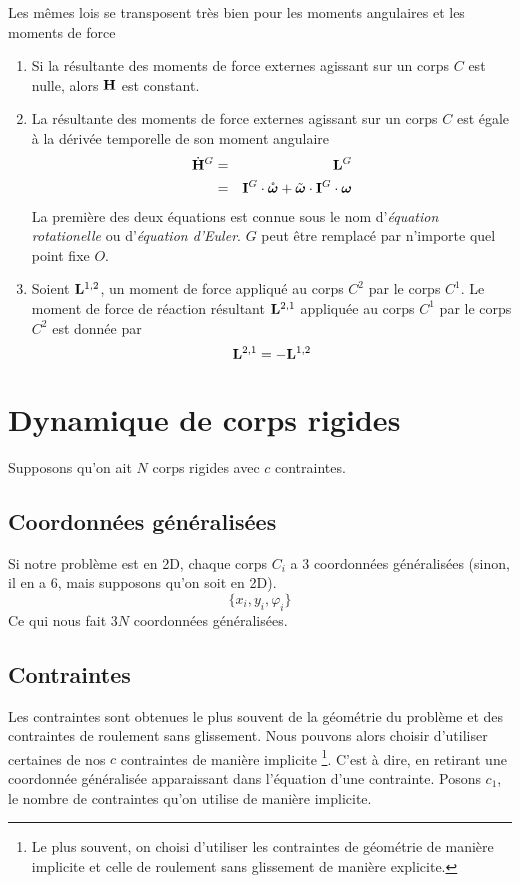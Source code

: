 \documentclass[11pt,a4paper]{article}
\newcommand\omegaf{{\bm \omega}}
\newcommand\omegafr{\mathring{\bm \omega}}
\newcommand\omegaft{\tilde{\bm \omega}}
\newcommand\ine{{\bf I}}
\newcommand\st{{\bf L}}
\newcommand\am{{\bf H}}
\newcommand\amd{\dot{\am}}
\begin{document}
Les mêmes lois se transposent très bien pour les moments angulaires et les moments de force
\begin{enumerate}
	\item Si la résultante des moments de force externes agissant sur un corps $C$ est nulle, alors $\am$ est constant.
	\item La résultante des moments de force externes agissant sur un corps $C$ est égale à la dérivée temporelle de son moment angulaire
		\begin{eqnarray*}
			\amd^G &=& \st^G\\
			&=& \ine^G\cdot\omegafr + \omegaft\cdot\ine^G\cdot\omegaf
		\end{eqnarray*}
		La première des deux équations est connue sous le nom d'{\em équation rotationelle} ou d'{\em équation d'Euler}.
		$G$ peut être remplacé par n'importe quel point fixe $O$.
	\item Soient $\st^{1,2}$, un moment de force appliqué au corps $C^2$ par le corps $C^1$.
		Le moment de force de réaction résultant $\st^{2,1}$ appliquée au corps $C^1$ par le corps $C^2$ est donnée par
		\[ \st^{2,1} = -\st^{1,2} \]
\end{enumerate}

\section{Dynamique de corps rigides}

Supposons qu'on ait $N$ corps rigides avec $c$ contraintes.

\subsection{Coordonnées généralisées}
Si notre problème est en 2D, chaque corps $C_i$ a 3 coordonnées généralisées (sinon, il en a 6, mais supposons qu'on soit en 2D).
\[ \{x_i, y_i, \varphi_i \} \]
Ce qui nous fait $3N$ coordonnées généralisées.

\subsection{Contraintes}
Les contraintes sont obtenues le plus souvent de la géométrie du problème et des contraintes de roulement sans glissement.
Nous pouvons alors choisir d'utiliser certaines de nos $c$ contraintes de manière implicite
\footnote{Le plus souvent, on choisi d'utiliser les contraintes de géométrie de manière implicite et celle de roulement sans glissement de manière explicite.}.
C'est à dire, en retirant une coordonnée généralisée apparaissant dans l'équation d'une contrainte.
Posons $c_1$, le nombre de contraintes qu'on utilise de manière implicite.
\end{document}
